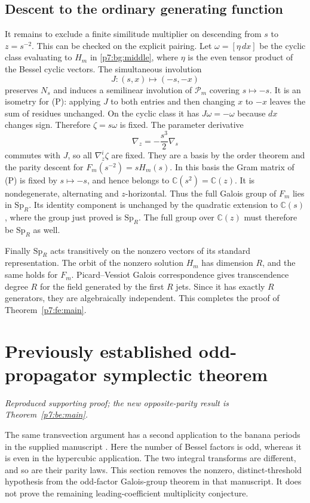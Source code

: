 \documentclass[11pt,a4paper]{article}
\theoremstyle{definition}
\theoremstyle{remark}
\numberwithin{equation}{section}
\begin{document}
\subsection{Descent to the ordinary generating function}

It remains to exclude a finite similitude multiplier on descending
from $s$ to $z=s^{-2}$. This can be checked on the explicit pairing.
Let $\omega=[\eta\,dx]$ be the cyclic class evaluating to $H_m$ in
\eqref{p7:bg:middle}, where $\eta$ is the even tensor product of the Bessel cyclic
vectors. The simultaneous involution
\[
 J:(s,x)\longmapsto(-s,-x)
\]
preserves $N_s$ and induces a semilinear involution of $\mathcal P_m$
covering $s\mapsto-s$. It is an isometry for (P): applying $J$ to
both entries and then changing $x$ to $-x$ leaves the sum of
residues unchanged. On the cyclic class it has $J\omega=-\omega$
because $dx$ changes sign. Therefore $\zeta=s\omega$ is fixed.
The parameter derivative
\[
 \nabla_z=-\frac{s^3}{2}\nabla_s
\]
commutes with $J$, so all $\nabla_z^i\zeta$ are fixed. They are a
basis by the order theorem and the parity descent for
$F_m(s^{-2})=sH_m(s)$. In this basis the Gram matrix of (P) is fixed
by $s\mapsto-s$, and hence belongs to
$\mathbb C(s^2)=\mathbb C(z)$. It is nondegenerate, alternating
and $z$-horizontal. Thus the full Galois group of $F_m$ lies in
$\mathrm{Sp}_R$. Its identity component is unchanged by the
quadratic extension to $\mathbb C(s)$, where the group just proved
is $\mathrm{Sp}_R$. The full group over $\mathbb C(z)$ must therefore
be $\mathrm{Sp}_R$ as well.

Finally $\mathrm{Sp}_R$ acts transitively on the nonzero vectors of
its standard representation. The orbit of the nonzero solution
$H_m$ has dimension $R$, and the same holds for $F_m$.
Picard--Vessiot Galois correspondence gives transcendence degree
$R$ for the field generated by the first $R$ jets. Since it has
exactly $R$ generators, they are algebraically independent.
This completes the proof of Theorem~\ref{p7:fe:main}.


\clearpage

\section{Previously established odd-propagator symplectic theorem}
\label{p7:front:banana}
\noindent\textit{Reproduced supporting proof; the new opposite-parity result is Theorem~\ref{p7:be:main}.}


The same transvection argument has a second application to the banana
periods in the supplied manuscript \cite{p5:Keio032}. Here the number of
Bessel factors is odd, whereas it is even in the hypercubic application.
The two integral transforms are different, and so are their parity laws.
This section removes the nonzero, distinct-threshold hypothesis from the
odd-factor Galois-group theorem in that manuscript. It does not prove
the remaining leading-coefficient multiplicity conjecture.
\end{document}
